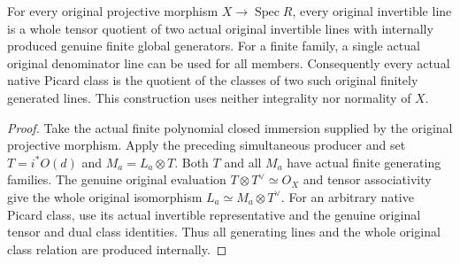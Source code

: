 \begin{theorem}
\label{thm:fc-original-projective-generated-line-quotients}
\leanok
{}
For every original projective morphism $X\to\operatorname{Spec}R$,
every original invertible line is a whole tensor quotient of two
actual original invertible lines with internally produced genuine
finite global generators. For a finite family, a single actual
original denominator line can be used for all members.
Consequently every actual native Picard class is the quotient of the
classes of two such original finitely generated lines.
This construction uses neither integrality nor normality of $X$.
\end{theorem}
\begin{proof}
Take the actual finite polynomial closed immersion supplied by the
original projective morphism. Apply the preceding simultaneous
producer and set $T=i^*O(d)$ and $M_a=L_a\otimes T$. Both $T$ and all
$M_a$ have actual finite generating families. The genuine original
evaluation $T\otimes T^\vee\simeq O_X$ and tensor associativity give
the whole original isomorphism $L_a\simeq M_a\otimes T^\vee$.
For an arbitrary native Picard class, use its actual invertible
representative and the genuine original tensor and dual class
identities. Thus all generating lines and the whole original class
relation are produced internally.
\end{proof}
